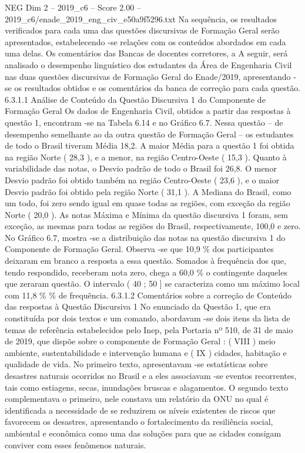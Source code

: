 \begin{textsample}{NEG Dim 2 – 2019\_c6 – Score 2.00 – 2019\_c6/enade\_2019\_eng\_civ\_e50a9f5296.txt}
Na sequência, os resultados verificados para cada uma das questões discursivas de Formação Geral serão apresentados, estabelecendo -se relações com os conteúdos abordados em cada uma delas.
Os comentários das Bancas de docentes corretores, a A seguir, será analisado o desempenho linguístico dos estudantes da Área de Engenharia Civil nas duas questões discursivas de Formação Geral do Enade/2019, apresentando -se os resultados obtidos e os comentários da banca de correção para cada questão. 6.3.1.1 Análise de Conteúdo da Questão Discursiva 1 do Componente de Formação Geral Os dados de Engenharia Civil, obtidos a partir das respostas à questão 1, encontram -se na Tabela 6.14 e no Gráfico 6.7.
Nessa questão – de desempenho semelhante ao da outra questão de Formação Geral – os estudantes de todo o Brasil tiveram Média 18,2.
A maior Média para a questão 1 foi obtida na região Norte ( 28,3 ), e a menor, na região Centro-Oeste ( 15,3 ).
Quanto à variabilidade das notas, o Desvio padrão de todo o Brasil foi 26,8.
O menor Desvio padrão foi obtido também na região Centro-Oeste ( 23,6 ), e o maior Desvio padrão foi obtido pela região Norte ( 31,1 ).
A Mediana do Brasil, como um todo, foi zero sendo igual em quase todas as regiões, com exceção da região Norte ( 20,0 ).
As notas Máxima e Mínima da questão discursiva 1 foram, sem exceção, as mesmas para todas as regiões do Brasil, respectivamente, 100,0 e zero.
No Gráfico 6.7, mostra -se a distribuição das notas na questão discursiva 1 do Componente de Formação Geral.
Observa -se que 10,9 \% dos participantes deixaram em branco a resposta a essa questão.
Somados à frequência dos que, tendo respondido, receberam nota zero, chega a 60,0 \% o contingente daqueles que zeraram questão.
O intervalo ( 40 ; 50 ] se caracteriza como um máximo local com 11,8 \% \% de frequência. 6.3.1.2 Comentários sobre a correção de Conteúdo das respostas à Questão Discursiva 1 No enunciado da Questão 1, que era constituída por dois textos e um comando, abordavam -se dois itens da lista de temas de referência estabelecidos pelo Inep, pela Portaria nº 510, de 31 de maio de 2019, que dispõe sobre o componente de Formação Geral : ( VIII ) meio ambiente, sustentabilidade e intervenção humana e ( IX ) cidades, habitação e qualidade de vida.
No primeiro texto, apresentavam -se estatísticas sobre desastres naturais ocorridos no Brasil e a eles associavam -se eventos recorrentes, tais como estiagens, secas, inundações bruscas e alagamentos.
O segundo texto complementava o primeiro, nele constava um relatório da ONU no qual é identificada a necessidade de se reduzirem os níveis existentes de riscos que favorecem os desastres, apresentando o fortalecimento da resiliência social, ambiental e econômica como uma das soluções para que as cidades consigam conviver com esses fenômenos naturais.

\end{textsample}

